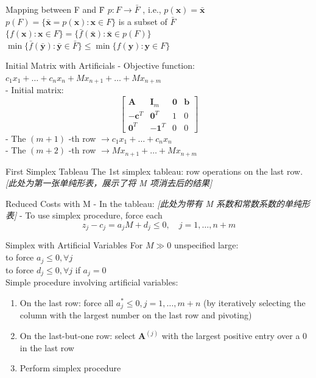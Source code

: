 \documentclass[aspectratio=169,hyperref,UTF8,CJK]{beamer}
\begin{document}
\begin{frame}{Mapping between F and F̄}
\(p:F\rightarrow \bar{F}\) , i.e., \(p(\mathbf{x}) = \bar{\mathbf{x}}\) \\
\(p(F) = \{\bar{\mathbf{x}} = p(\mathbf{x}):\mathbf{x}\in F\}\) is a subset of \(\bar{F}\) \\
\(\{f(\mathbf{x}):\mathbf{x}\in F\} = \{\bar{f} (\bar{\mathbf{x}}):\bar{\mathbf{x}}\in p(F)\}\) \\
\(\min \{\bar{f} (\bar{\mathbf{y}}):\bar{\mathbf{y}}\in \bar{F}\} \leq \min \{f(\mathbf{y}):\mathbf{y}\in F\}\)
\end{frame}

\begin{frame}{Initial Matrix with Artificials}
- Objective function: \(c_1x_1 + \ldots + c_nx_n + Mx_{n+1} + \ldots + Mx_{n+m}\) \\
- Initial matrix:
\[
\begin{bmatrix}
\mathbf{A} & \mathbf{I}_m & \mathbf{0} & \mathbf{b} \\
-\mathbf{c}^T & \mathbf{0}^T & 1 & 0 \\
\mathbf{0}^T & -\mathbf{1}^T & 0 & 0
\end{bmatrix}
\]
- The \((m+1)\) -th row \(\longrightarrow c_1x_1 + \ldots + c_nx_n\) \\
- The \((m+2)\) -th row \(\longrightarrow Mx_{n+1} + \ldots + Mx_{n+m}\)
\end{frame}

\begin{frame}{First Simplex Tableau}
The 1st simplex tableau: row operations on the last row. \\
\textit{[此处为第一张单纯形表，展示了将 M 项消去后的结果]}
\end{frame}

\begin{frame}{Reduced Costs with M}
- In the tableau:
\textit{[此处为带有 M 系数和常数系数的单纯形表]}
- To use simplex procedure, force each
\[
z_{j} - c_{j} = a_{j}M + d_{j}\leq 0,\quad j = 1,\ldots ,n + m
\]
\end{frame}

\begin{frame}{Simplex with Artificial Variables}
For \(M \gg 0\) unspecified large: \\
to force \(a_j \leq 0, \forall j\) \\
to force \(d_j \leq 0, \forall j\) if \(a_j = 0\) \\
Simple procedure involving artificial variables:
\begin{enumerate}
    \item On the last row: force all \(a_j^* \leq 0, j = 1, \ldots , m + n\) (by iteratively selecting the column with the largest number on the last row and pivoting)
    \item On the last-but-one row: select \(\mathbf{A}^{(j)}\) with the largest positive entry over a 0 in the last row
    \item Perform simplex procedure
\end{enumerate}
\end{frame}
\end{document}
